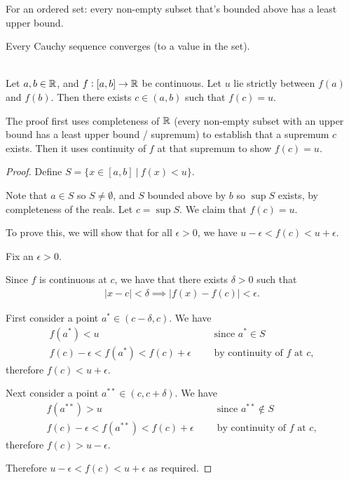 \documentclass[12pt]{article}
\begin{document}
\begin{definition*}
  For an ordered set: every non-empty subset that's bounded above has a least upper bound.
\end{definition*}


\begin{definition*}
  Every Cauchy sequence converges (to a value in the set).
\end{definition*}


\begin{theorem*}~\\
  Let $a, b \in \mathbb{R}$, and $f:[a, b] \to \mathbb{R}$ be continuous. Let $u$ lie strictly between $f(a)$ and
  $f(b)$. Then there exists $c \in (a, b)$ such that $f(c) = u$.
\end{theorem*}

\begin{remark*}
  The proof first uses completeness of $\mathbb{R}$ (every non-empty subset with an upper bound has a least
  upper bound / supremum) to establish that a supremum $c$ exists. Then it uses continuity of $f$
  at that supremum to show $f(c) = u$.
\end{remark*}

\begin{proof}
  Define $S = \{x \in [a, b] ~|~ f(x) < u\}$.

  Note that $a \in S$ so $S \neq \emptyset$, and $S$ bounded above by $b$ so $\sup S$ exists, by
  completeness of the reals. Let $c = \sup S$. We claim that $f(c) = u$.

  To prove this, we will show that for all $\epsilon > 0$, we have
  $u - \epsilon < f(c) < u + \epsilon$.

  Fix an $\epsilon > 0$.

  Since $f$ is continuous at $c$, we have that there exists $\delta > 0$ such that
  \begin{align*}
    |x - c| < \delta \implies |f(x) - f(c)| < \epsilon.
  \end{align*}

  First consider a point $a^* \in (c - \delta, c)$. We have
  \begin{align*}
    f(a^*) < u                                    ~~~~~~~&\text{since $a^* \in S$}\\
    f(c) - \epsilon < f(a^*) < f(c) + \epsilon    ~~~~~~~&\text{by continuity of $f$ at $c$},
  \end{align*}
  therefore $f(c) < u + \epsilon$.

  Next consider a point $a^{**} \in (c, c + \delta)$. We have
  \begin{align*}
    f(a^{**}) > u                                  ~~~~~~~&\text{since $a^{**} \notin S$}\\
    f(c) - \epsilon < f(a^{**}) < f(c) + \epsilon  ~~~~~~~&\text{by continuity of $f$ at $c$},
  \end{align*}
  therefore $f(c) > u - \epsilon$.

  Therefore $u - \epsilon < f(c) < u + \epsilon$ as required.
\end{proof}
\end{document}
